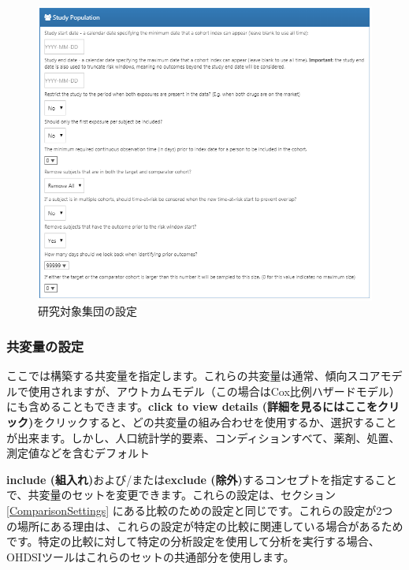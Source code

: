 \documentclass[
  11pt]{book}
\theoremstyle{definition}
\theoremstyle{definition}
\theoremstyle{definition}
\theoremstyle{definition}
\theoremstyle{remark}
\begin{document}
\begin{figure}

{\centering \includegraphics[width=1\linewidth]{images/PopulationLevelEstimation/studyPopulation} 

}

\caption{研究対象集団の設定}\label{fig:studyPopulation}
\end{figure}

\subsubsection*{共変量の設定}\label{ux5171ux5909ux91cfux306eux8a2dux5b9a}

ここでは構築する共変量を指定します。これらの共変量は通常、傾向スコアモデルで使用されますが、アウトカムモデル（この場合はCox比例ハザードモデル）にも含めることもできます。\textbf{click to view details (詳細を見るにはここをクリック)}をクリックすると、どの共変量の組み合わせを使用するか、選択することが出来ます。しかし、人口統計学的要素、コンディションすべて、薬剤、処置、測定値などを含むデフォルト

\textbf{include (組入れ)}および/または\textbf{exclude (除外)}するコンセプトを指定することで、共変量のセットを変更できます。これらの設定は、セクション \ref{ComparisonSettings} にある比較のための設定と同じです。これらの設定が2つの場所にある理由は、これらの設定が特定の比較に関連している場合があるためです。特定の比較に対して特定の分析設定を使用して分析を実行する場合、OHDSIツールはこれらのセットの共通部分を使用します。
\end{document}
